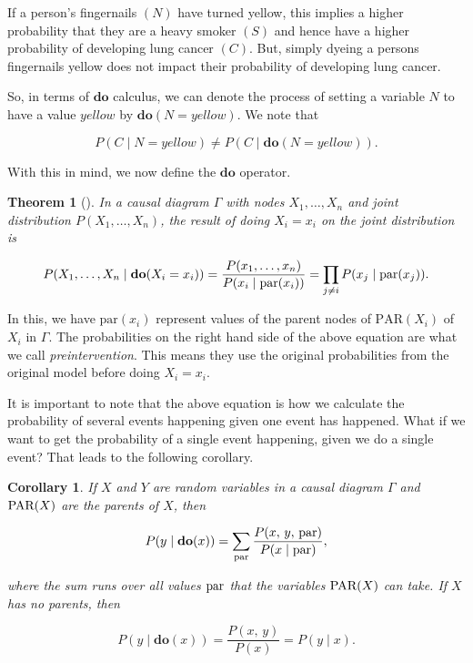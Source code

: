\documentclass{article}
\newtheorem{theorem}{Theorem}[section]
\newtheorem{corollary}{Corollary}[theorem]
\begin{document}
If a person's fingernails $(N)$ have turned yellow, this implies a higher probability 
that they are a heavy smoker $(S)$ and hence have a higher probability of developing 
lung cancer $(C)$. But, simply dyeing a persons fingernails yellow does not impact 
their probability of developing lung cancer. 

So, in terms of $\textbf{do}$ calculus, we can denote the process of setting a 
variable $N$ to have a value $\textit{yellow}$ by $\textbf{do}(N = \textit{yellow})$. 
We note that 

\begin{equation*}
P(C \;|\;N = \textit{yellow}) \neq P(C\;|\; \textbf{do}(N=\textit{yellow})).
\end{equation*}

With this in mind, we now define the $\textbf{do}$ operator.

\begin{theorem}[{{\cite{pearl2009causal}}}]
    In a causal diagram $\Gamma$ with nodes $X_1,\dots, X_n$ and joint distribution 
    $P(X_1, \dots, X_n)$, the result of doing $X_i = x_i$ on the joint distribution is

    \[
        P(X_1, \dots, X_n \;|\; \textbf{do}(X_i = x_i)) = \frac{P(x_1,\dots,x_n)}{P(x_i\;|\; \textup{par}(x_i))} = \prod_{j\neq i}P(x_j\;|\; \textup{par}(x_j)).
    \]
    \label{theorem:do}
\end{theorem}

In this, we have $\text{par}(x_i)$ represent values of the parent nodes of $\text{PAR}(X_i)$ of $X_i$ in $\Gamma$.
The probabilities on the right hand side of the above equation are what we call \textit{preintervention}. 
This means they use the original probabilities from the original model before doing $X_i = x_i$.

It is important to note that the above equation is how we calculate the probability of several events 
happening given one event has happened. What if we want to get the probability of a single event happening, 
given we do a single event? That leads to the following corollary.

\begin{corollary}
    If $X$ and $Y$ are random variables in a causal diagram $\Gamma$ and $\textup{PAR}(X)$ are the parents of $X$, then

    \[P(y\;|\;  \textbf{do}(x)) = \sum_{\textup{par}}\frac{P(x,\,y,\,\textup{par})}{P(x\;|\; \textup{par})},\]

    where the sum runs over all values $\textup{par}$ that the variables $\textup{PAR}(X)$ can take. If $X$ has no parents, then

    \[P(y\;|\; \textbf{do}(x)) = \frac{P(x,\,y)}{P(x)} = P(y\;|\; x).\]
    \label{corollary:do}
\end{corollary}
\end{document}
